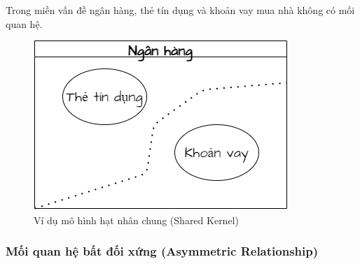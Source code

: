 \begin{example} Trong miền vấn đề ngân hàng, thẻ tín dụng và khoản vay mua nhà không có mối quan hệ.

\begin{figure}[H]

\centering

\includegraphics[scale = 0.5]{pictures/mo_hinh_rieng_biet_separate_ways/main.drawio.png}

\caption{Ví dụ mô hình hạt nhân chung (Shared Kernel)}

\end{figure}

\end{example}








\subsubsection{Mối quan hệ bất đối xứng (Asymmetric Relationship)}








